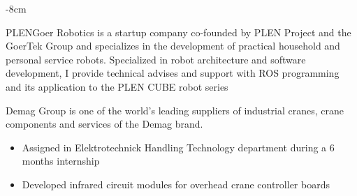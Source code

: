 \documentclass[10pt,a4paper]{altacv}
\begin{document}

\begin{adjustwidth}{}{-8cm}
\makecvheader
\end{adjustwidth}


PLENGoer Robotics is a startup company co-founded by PLEN Project and the GoerTek Group and specializes in the development of practical household and personal service robots.
Specialized in robot architecture and software development, I provide technical advises and support with ROS programming and its application to the PLEN CUBE robot series

\divider

Demag Group is one of the world's leading suppliers of industrial cranes, crane components and services of the Demag brand.
\begin{itemize}
\item Assigned in Elektrotechnick Handling Technology department during a 6 months internship
\item Developed infrared circuit modules for overhead crane controller boards
\end{itemize}

\divider
\end{document}
